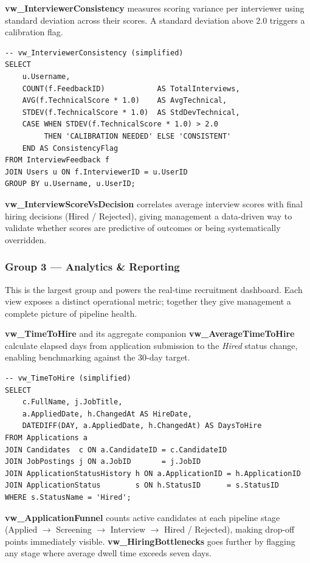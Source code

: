 \documentclass[11pt,a4paper]{article}
\begin{document}
\textbf{vw\_InterviewerConsistency} measures scoring variance per interviewer using standard deviation across their scores. A standard deviation above 2.0 triggers a calibration flag.

\begin{verbatim}
-- vw_InterviewerConsistency (simplified)
SELECT
    u.Username,
    COUNT(f.FeedbackID)            AS TotalInterviews,
    AVG(f.TechnicalScore * 1.0)    AS AvgTechnical,
    STDEV(f.TechnicalScore * 1.0)  AS StdDevTechnical,
    CASE WHEN STDEV(f.TechnicalScore * 1.0) > 2.0
         THEN 'CALIBRATION NEEDED' ELSE 'CONSISTENT'
    END AS ConsistencyFlag
FROM InterviewFeedback f
JOIN Users u ON f.InterviewerID = u.UserID
GROUP BY u.Username, u.UserID;
\end{verbatim}

\textbf{vw\_InterviewScoreVsDecision} correlates average interview scores with final hiring decisions (Hired / Rejected), giving management a data-driven way to validate whether scores are predictive of outcomes or being systematically overridden.

\subsubsection{Group 3 — Analytics \& Reporting}

This is the largest group and powers the real-time recruitment dashboard. Each view exposes a distinct operational metric; together they give management a complete picture of pipeline health.

\textbf{vw\_TimeToHire} and its aggregate companion \textbf{vw\_AverageTimeToHire} calculate elapsed days from application submission to the \textit{Hired} status change, enabling benchmarking against the 30-day target.

\begin{verbatim}
-- vw_TimeToHire (simplified)
SELECT
    c.FullName, j.JobTitle,
    a.AppliedDate, h.ChangedAt AS HireDate,
    DATEDIFF(DAY, a.AppliedDate, h.ChangedAt) AS DaysToHire
FROM Applications a
JOIN Candidates  c ON a.CandidateID = c.CandidateID
JOIN JobPostings j ON a.JobID       = j.JobID
JOIN ApplicationStatusHistory h ON a.ApplicationID = h.ApplicationID
JOIN ApplicationStatus        s ON h.StatusID      = s.StatusID
WHERE s.StatusName = 'Hired';
\end{verbatim}

\textbf{vw\_ApplicationFunnel} counts active candidates at each pipeline stage (Applied $\rightarrow$ Screening $\rightarrow$ Interview $\rightarrow$ Hired / Rejected), making drop-off points immediately visible. \textbf{vw\_HiringBottlenecks} goes further by flagging any stage where average dwell time exceeds seven days.
\end{document}
